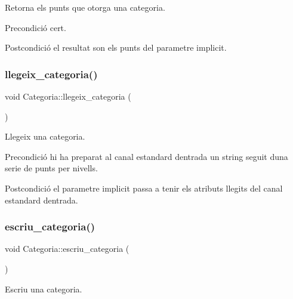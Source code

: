 Retorna els punts que otorga una categoria. 

\begin{DoxyPrecond}{Precondició}
cert. 
\end{DoxyPrecond}
\begin{DoxyPostcond}{Postcondició}
el resultat son els punts del parametre implicit. 
\end{DoxyPostcond}
\mbox{\label{class_categoria_afcc187c0f598d99f85873ef3fc60013f}} 
\subsubsection{\texorpdfstring{llegeix\+\_\+categoria()}{llegeix\_categoria()}}
{\footnotesize\ttfamily void Categoria\+::llegeix\+\_\+categoria (\begin{DoxyParamCaption}{ }\end{DoxyParamCaption})}



Llegeix una categoria. 

\begin{DoxyPrecond}{Precondició}
hi ha preparat al canal estandard d\textquotesingle{}entrada un string seguit d\textquotesingle{}una serie de punts per nivells. 
\end{DoxyPrecond}
\begin{DoxyPostcond}{Postcondició}
el parametre implicit passa a tenir els atributs llegits del canal estandard d\textquotesingle{}entrada. 
\end{DoxyPostcond}
\mbox{\label{class_categoria_ace72584479577989887645222ca5f540}} 
\subsubsection{\texorpdfstring{escriu\+\_\+categoria()}{escriu\_categoria()}}
{\footnotesize\ttfamily void Categoria\+::escriu\+\_\+categoria (\begin{DoxyParamCaption}{ }\end{DoxyParamCaption})}



Escriu una categoria. 

